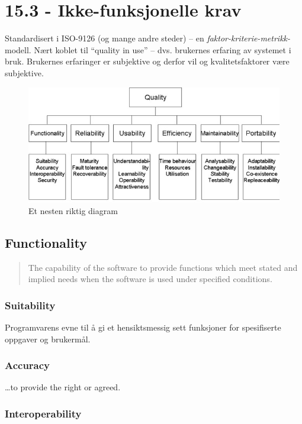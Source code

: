 \section{15.3 - Ikke-funksjonelle krav}

Standardisert i ISO-9126 (og mange andre steder) -- en
\emph{faktor-kriterie-metrikk-}modell. Nært koblet til ``quality in
use'' -- dvs. brukernes erfaring av systemet i bruk. Brukernes
erfaringer er subjektive og derfor vil og kvalitetsfaktorer være
subjektive.

\begin{figure}[htbp]
\centering
\includegraphics{Forelesning 15/img/quality.jpg}
\caption{Et nesten riktig diagram}
\end{figure}

\subsection{Functionality}

\begin{quote}
The capability of the software to provide functions which meet stated
and implied needs when the software is used under specified conditions.

\end{quote}
\subsubsection{Suitability}

Programvarens evne til å gi et hensiktsmessig sett funksjoner for
spesifiserte oppgaver og brukermål.

\subsubsection{Accuracy}

\ldots{}to provide the right or agreed.

\subsubsection{Interoperability}

